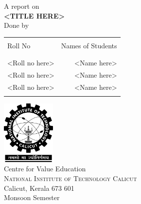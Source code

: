 \begin{titlepage}

\begin{center}

\textup{\large A report on}\\[1.0cm]

\uppercase{\Large \textbf {<title here>}}\\[3.0cm]

\normalsize Done by \\
\begin{table}[h]
\centering
\begin{tabular}{lr}\hline \\
Roll No & Names of Students \\ \\ \hline
\\
<Roll no here> & <Name here> \\
<Roll no here> & <Name here> \\ 
<Roll no here> & <Name here> \\ \\ \hline 
\end{tabular}
\end{table}

\vfill

\includegraphics[width=0.20\textwidth]{./nitc-logo}\\[1cm]
\LARGE{Centre for Value Education}\\
\normalsize
\textsc{National Institute of Technology Calicut}\\
Calicut, Kerala 673 601 \\
\vspace{0.5cm}
Monsoon Semester

\end{center}

\end{titlepage}

